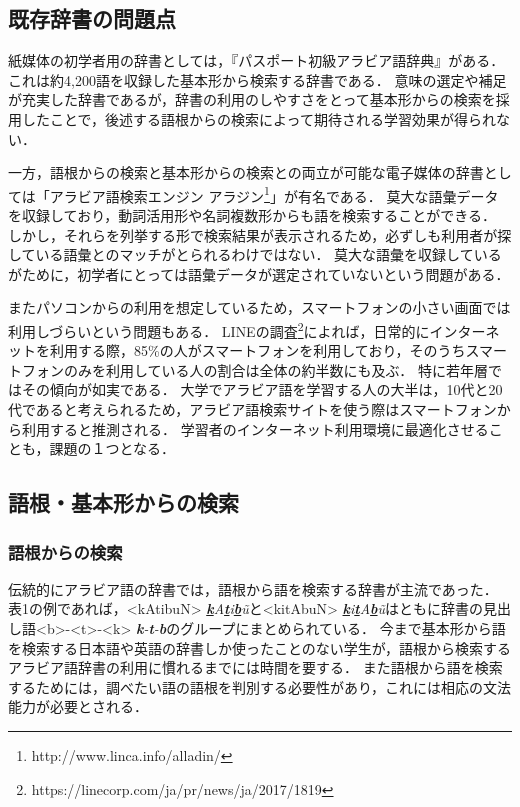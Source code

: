 \documentclass[technicalreport]{ieicej}
\begin{document}
\subsection{既存辞書の問題点}
紙媒体の初学者用の辞書としては，『パスポート初級アラビア語辞典』がある．
これは約4,200語を収録した基本形から検索する辞書である．
意味の選定や補足が充実した辞書であるが，辞書の利用のしやすさをとって基本形からの検索を採用したことで，後述する語根からの検索によって期待される学習効果が得られない．

一方，語根からの検索と基本形からの検索との両立が可能な電子媒体の辞書としては「アラビア語検索エンジン アラジン\footnote{http://www.linca.info/alladin/}」が有名である．
莫大な語彙データを収録しており，動詞活用形や名詞複数形からも語を検索することができる．
しかし，それらを列挙する形で検索結果が表示されるため，必ずしも利用者が探している語彙とのマッチがとられるわけではない．
莫大な語彙を収録しているがために，初学者にとっては語彙データが選定されていないという問題がある．

またパソコンからの利用を想定しているため，スマートフォンの小さい画面では利用しづらいという問題もある．
LINEの調査\footnote{https://linecorp.com/ja/pr/news/ja/2017/1819}によれば，日常的にインターネットを利用する際，85\%の人がスマートフォンを利用しており，そのうちスマートフォンのみを利用している人の割合は全体の約半数にも及ぶ．
特に若年層ではその傾向が如実である．
大学でアラビア語を学習する人の大半は，10代と20代であると考えられるため，アラビア語検索サイトを使う際はスマートフォンから利用すると推測される．
学習者のインターネット利用環境に最適化させることも，課題の１つとなる．

\subsection{語根・基本形からの検索}
\subsubsection{語根からの検索}
伝統的にアラビア語の辞書では，語根から語を検索する辞書が主流であった．
表1の例であれば，<kAtibuN> \textit{\underline{\textbf{k}}A\underline{\textbf{t}}i\underline{\textbf{b}}\~u}と<kitAbuN> \textit{\underline{\textbf{k}}i\underline{\textbf{t}}A\underline{\textbf{b}}\~u}はともに辞書の見出し語<b>-<t>-<k> \textit{\textbf{k}-\textbf{t}-\textbf{b}}のグループにまとめられている．
今まで基本形から語を検索する日本語や英語の辞書しか使ったことのない学生が，語根から検索するアラビア語辞書の利用に慣れるまでには時間を要する．
また語根から語を検索するためには，調べたい語の語根を判別する必要性があり，これには相応の文法能力が必要とされる．
\end{document}
